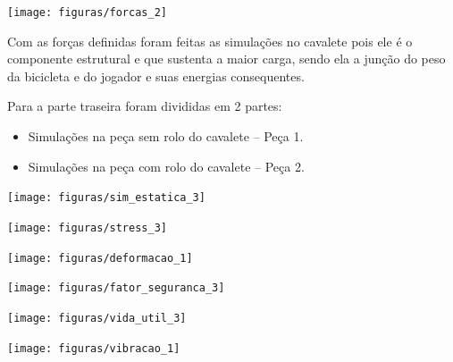    \begin{center}
    	\texttt{[image: figuras/forcas\_2]}
        \label{forcas_2}
    \end{center}  
 
    Com as forças definidas foram feitas as simulações no cavalete pois ele é o componente estrutural e que sustenta a maior carga, sendo ela a junção do peso da bicicleta e do jogador e suas energias consequentes.
 
    Para a parte traseira foram divididas em 2 partes:
    \begin{itemize}
        \item Simulações na peça sem rolo do cavalete – Peça 1.
        \item Simulações na peça com rolo do cavalete – Peça 2.
    \end{itemize}
 
    \begin{center}
    	\texttt{[image: figuras/sim\_estatica\_3]}
        \label{sim_estatica_3}
    \end{center}
    
    \begin{center}
    	\texttt{[image: figuras/stress\_3]}
        \label{stress_3}
    \end{center}
    
    \begin{center}
    	\texttt{[image: figuras/deformacao\_1]}
        \label{deformacao_1}
    \end{center}

    \begin{center}
    	\texttt{[image: figuras/fator\_seguranca\_3]}
        \label{fator_seguranca_3}
    \end{center}
    
    \begin{center}
    	\texttt{[image: figuras/vida\_util\_3]}
        \label{vida_util_3}
    \end{center}

    \begin{center}
    	\texttt{[image: figuras/vibracao\_1]}
        \label{vibracao_1}
    \end{center}    
 
